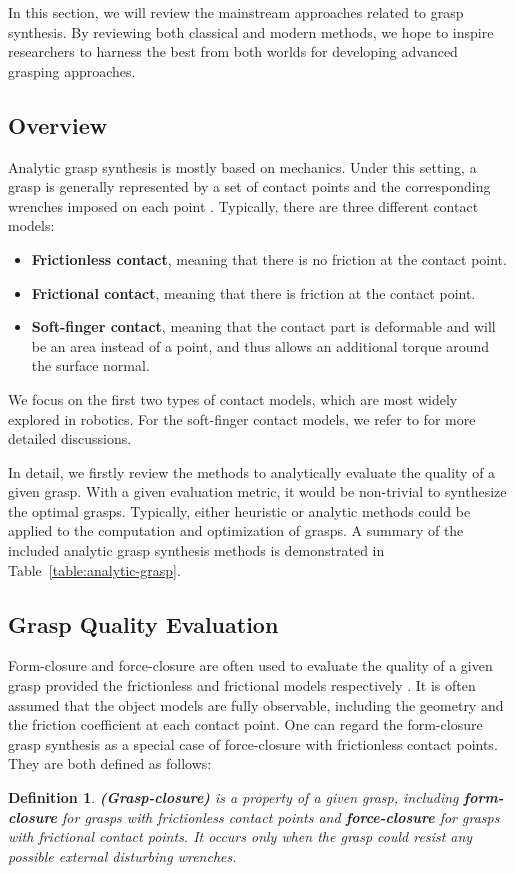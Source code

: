 \documentclass[letterpaper,10pt]{article}
\newcommand{\tabref}[1]{Table~\ref{#1}}
\newtheorem{definition}{Definition}
\begin{document}
In this section, we will review the mainstream approaches related to grasp synthesis.
By reviewing both classical and modern methods, we hope to inspire researchers to harness the best from both worlds for developing advanced grasping approaches.

\subsection{Overview}

Analytic grasp synthesis is mostly based on mechanics.
Under this setting, a grasp is generally represented by a set of contact points and the corresponding wrenches imposed on each point \cite{bicchi2000robotic}.
Typically, there are three different contact models:
\begin{itemize}
	\item {\bf Frictionless contact}, meaning that there is no friction at the contact point.
	\item {\bf Frictional contact}, meaning that there is friction at the contact point.
	\item {\bf Soft-finger contact}, meaning that the contact part is deformable and will be an area instead of a point, and thus allows an additional torque around the surface normal.
\end{itemize}
We focus on the first two types of contact models, which are most widely explored in robotics.
For the soft-finger contact models, we refer to \cite{elango2015review} for more detailed discussions.

In detail, we firstly review the methods to analytically evaluate the quality of a given grasp.
With a given evaluation metric, it would be non-trivial to synthesize the optimal grasps. Typically, either heuristic or analytic methods could be applied to the computation and optimization of grasps. A summary of the included analytic grasp synthesis methods is demonstrated in \tabref{table:analytic-grasp}.

\subsection{Grasp Quality Evaluation}
\label{sec:analytic-grasp-eval}

Form-closure and force-closure are often used to evaluate the quality of a given grasp provided the frictionless and frictional models respectively \cite{bicchi1995closure}.
It is often assumed that the object models are fully observable, including the geometry and the friction coefficient at each contact point.
One can regard the form-closure grasp synthesis as a special case of force-closure with frictionless contact points.
They are both defined as follows:
\begin{definition}
\label{def:grasp-closure}
	{\bf (Grasp-closure)} is a property of a given grasp, including {\bf form-closure} for grasps with frictionless contact points and {\bf force-closure} for grasps with frictional contact points. It occurs only when the grasp could resist any possible external disturbing wrenches. 
\end{definition}
\end{document}
